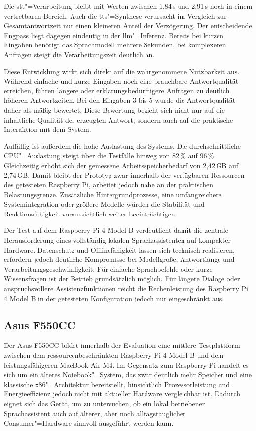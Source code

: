 Die \gls{stt}"=Verarbeitung bleibt mit Werten zwischen 1,84\,s und 2,91\,s noch in einem vertretbaren Bereich. Auch die \gls{tts}"=Synthese verursacht im Vergleich zur Gesamtantwortzeit nur einen kleineren Anteil der Verzögerung. Der entscheidende Engpass liegt dagegen eindeutig in der \gls{llm}"=Inferenz. Bereits bei kurzen Eingaben benötigt das Sprachmodell mehrere Sekunden, bei komplexeren Anfragen steigt die Verarbeitungszeit deutlich an.

Diese Entwicklung wirkt sich direkt auf die wahrgenommene Nutzbarkeit aus. Während einfache und kurze Eingaben noch eine brauchbare Antwortqualität erreichen, führen längere oder erklärungsbedürftigere Anfragen zu deutlich höheren Antwortzeiten. Bei den Eingaben 3 bis 5 wurde die Antwortqualität daher als mäßig bewertet. Diese Bewertung bezieht sich nicht nur auf die inhaltliche Qualität der erzeugten Antwort, sondern auch auf die praktische Interaktion mit dem System.

Auffällig ist außerdem die hohe Auslastung des Systems. Die durchschnittliche CPU"=Auslastung steigt über die Testfälle hinweg von 82\,\% auf 96\,\%. Gleichzeitig erhöht sich der gemessene Arbeitsspeicherbedarf von 2,42\,GB auf 2,74\,GB. Damit bleibt der Prototyp zwar innerhalb der verfügbaren Ressourcen des getesteten Raspberry Pi, arbeitet jedoch nahe an der praktischen Belastungsgrenze. Zusätzliche Hintergrundprozesse, eine umfangreichere Systemintegration oder größere Modelle würden die Stabilität und Reaktionsfähigkeit voraussichtlich weiter beeinträchtigen.

Der Test auf dem Raspberry Pi 4 Model B verdeutlicht damit die zentrale Herausforderung eines vollständig lokalen Sprachassistenten auf kompakter Hardware. Datenschutz und Offlinefähigkeit lassen sich technisch realisieren, erfordern jedoch deutliche Kompromisse bei Modellgröße, Antwortlänge und Verarbeitungsgeschwindigkeit. Für einfache Sprachbefehle oder kurze Wissensfragen ist der Betrieb grundsätzlich möglich. Für längere Dialoge oder anspruchsvollere Assistenzfunktionen reicht die Rechenleistung des Raspberry Pi 4 Model B in der getesteten Konfiguration jedoch nur eingeschränkt aus.


\subsection{Asus F550CC}
\label{subsec:Asus_F550CC}
Der Asus F550CC bildet innerhalb der Evaluation eine mittlere Testplattform zwischen dem ressourcenbeschränkten Raspberry Pi 4 Model B und dem leistungsfähigeren MacBook Air M4. Im Gegensatz zum Raspberry Pi handelt es sich um ein älteres Notebook"=System, das zwar deutlich mehr Speicher und eine klassische x86"=Architektur bereitstellt, hinsichtlich Prozessorleistung und Energieeffizienz jedoch nicht mit aktueller Hardware vergleichbar ist. Dadurch eignet sich das Gerät, um zu untersuchen, ob ein lokal betriebener Sprachassistent auch auf älterer, aber noch alltagstauglicher Consumer"=Hardware sinnvoll ausgeführt werden kann.

